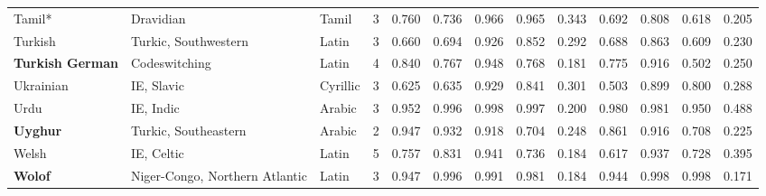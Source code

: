 \begin{tabular}{lllrrrrrrrrrr}
                 Tamil* &                       Dravidian &      Tamil &         3 &                       0.760 &                         0.736 &         0.966 &                  0.965 &            0.343 &                         0.692 &         0.808 &                  0.618 &            0.205 \\
                Turkish &            Turkic, Southwestern &      Latin &         3 &                       0.660 &                         0.694 &         0.926 &                  0.852 &            0.292 &                         0.688 &         0.863 &                  0.609 &            0.230 \\
\textbf{Turkish German} &                   Codeswitching &      Latin &         4 &                       0.840 &                         0.767 &         0.948 &                  0.768 &            0.181 &                         0.775 &         0.916 &                  0.502 &            0.250 \\
              Ukrainian &                      IE, Slavic &   Cyrillic &         3 &                       0.625 &                         0.635 &         0.929 &                  0.841 &            0.301 &                         0.503 &         0.899 &                  0.800 &            0.288 \\
                   Urdu &                       IE, Indic &     Arabic &         3 &                       0.952 &                         0.996 &         0.998 &                  0.997 &            0.200 &                         0.980 &         0.981 &                  0.950 &            0.488 \\
        \textbf{Uyghur} &            Turkic, Southeastern &     Arabic &         2 &                       0.947 &                         0.932 &         0.918 &                  0.704 &            0.248 &                         0.861 &         0.916 &                  0.708 &            0.225 \\
                  Welsh &                      IE, Celtic &      Latin &         5 &                       0.757 &                         0.831 &         0.941 &                  0.736 &            0.184 &                         0.617 &         0.937 &                  0.728 &            0.395 \\
         \textbf{Wolof} &  Niger-Congo, Northern Atlantic &      Latin &         3 &                       0.947 &                         0.996 &         0.991 &                  0.981 &            0.184 &                         0.944 &         0.998 &                  0.998 &            0.171 \\
\bottomrule
\end{tabular}
